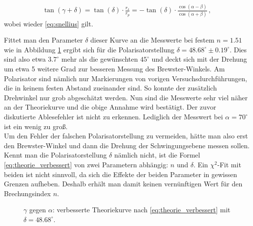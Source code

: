 \documentclass[12pt,a4paper,titlepage,headinclude,bibtotoc]{scrartcl}
\begin{document}
\begin{align}
	\tan(\gamma+\delta)=\tan(\delta)\cdot\frac{r_s}{r_p}=-\tan(\delta)\cdot\frac{\cos(\alpha-\beta)}{\cos(\alpha+\beta)}\,,
	\label{eq:theorie_verbessert}
\end{align}
wobei wieder \eqref{eq:snellius} gilt.

Fittet man den Parameter $\delta$ dieser Kurve an die Messwerte bei festem $n=1.51$ wie in Abbildung \ref{fig:drehung_disk} ergibt sich für die Polarisatorstellung $\delta=48.68^\circ \pm 0.19^\circ$.
Dies sind also etwa $3.7^\circ$ mehr als die gewünschten $45^\circ$ und deckt sich mit der Drehung um etwa 5 weitere Grad zur besseren Messung des Brewster-Winkels.
Am Polarisator sind nämlich nur Markierungen von vorigen Versuchsdurchführungen, die in keinem festen Abstand zueinander sind.
So konnte der zusätzlich Drehwinkel nur grob abgeschätzt werden.
Nun sind die Messwerte sehr viel näher an der Theoriekurve und die obige Annahme wird bestätigt.
Der zuvor diskutierte Ablesefehler ist nicht zu erkennen.
Lediglich der Messwert bei $\alpha=70^\circ$ ist ein wenig zu groß.\\

Um den Fehler der falschen Polarisatorstellung zu vermeiden, hätte man also erst den Brewster-Winkel und dann die Drehung der Schwingungsebene messen sollen.
Kennt man die Polarisatorstellung $\delta$ nämlich nicht, ist die  Formel \eqref{eq:theorie_verbessert} von zwei Parametern abhängig: $n$ und $\delta$.
Ein $\chi^2$-Fit mit beiden ist nicht sinnvoll, da sich die Effekte der beiden Parameter in gewissen Grenzen aufheben.
Deshalb erhält man damit keinen vernünftigen Wert für den Brechungsindex $n$.

\begin{figure}[!htb]
	\centering
	
	\caption{$\gamma$ gegen $\alpha$: verbesserte Theoriekurve nach \eqref{eq:theorie_verbessert} mit $\delta=48.68^\circ$.}
	\label{fig:drehung_disk}
\end{figure}




\end{document}
